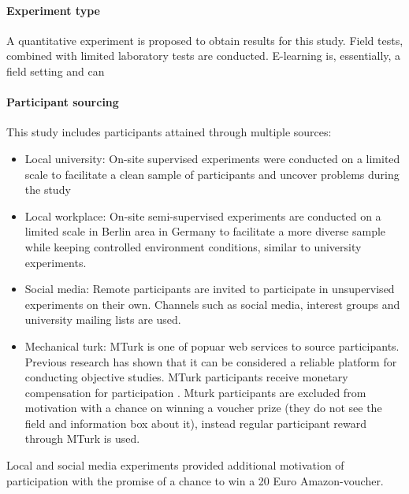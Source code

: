 \paragraph{Experiment type} A quantitative experiment is proposed to obtain results for this study. Field tests, combined with limited laboratory tests are conducted. E-learning is, essentially, a field setting and can

\paragraph{Participant sourcing} 
This study includes participants attained through multiple sources:
\begin{itemize}
	\item{Local university:} On-site supervised experiments were conducted on a limited scale to facilitate a clean sample of participants and uncover problems during the study
	
	\item{Local workplace:} On-site semi-supervised experiments are conducted on a limited scale in Berlin area in Germany to facilitate a more diverse sample while keeping controlled environment conditions, similar to university experiments.
	
	\item{Social media:} Remote participants are invited to participate in unsupervised experiments on their own. Channels such as social media, interest groups and university mailing lists are used.
	
	\item{Mechanical turk:} MTurk is one of popuar web services to source participants. Previous research has shown that it can be considered a reliable platform for conducting objective studies. MTurk participants receive monetary compensation for participation \cite{Buhrmester2011a}. Mturk participants are excluded from motivation with a chance on winning a voucher prize (they do not see the field and information box about it), instead regular participant reward through MTurk is used.
	
\end{itemize}

Local and social media experiments provided additional motivation of participation with the promise of a chance to win a 20 Euro Amazon-voucher.